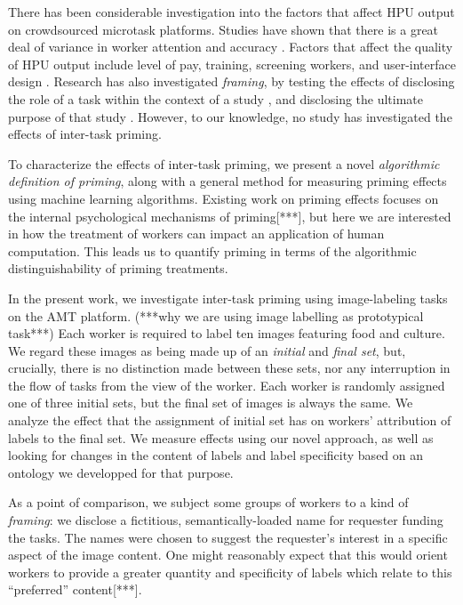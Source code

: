 \documentclass[a4paper]{report}
\begin{document}
There has been considerable investigation into the factors that affect HPU 
output on crowdsourced microtask platforms.  Studies have shown that 
there is a great deal of variance in worker attention and 
accuracy \cite{kazai2013analysis}.  Factors that affect the quality of HPU 
output include level of pay\cite{kazai2013analysis}, 
training\cite{le2010ensuring}, screening workers\cite{paolacci2010running}, 
and user-interface design
\cite{Finnerty2013}.  Research has also investigated \textit{framing}, 
by testing the effects of disclosing the role of a task within the 
context of a study \cite{Kinnaird2012281}, and disclosing the ultimate 
purpose of that study \cite{chandler2013breaking}.  However, to our knowledge, 
no study has investigated the effects of inter-task priming.

To characterize the effects of inter-task priming, we present a novel  
\textit{algorithmic definition of priming}, along with a general method 
for measuring priming effects using machine learning algorithms.  
Existing work on priming effects focuses on the internal psychological 
mechanisms of priming[***], but here we are interested in how the treatment of 
workers can impact an application of human computation. This leads us to 
quantify priming in terms of the algorithmic distinguishability of priming
treatments.

In the present work, we investigate inter-task priming using image-labeling 
tasks on the AMT platform.  
(***why we are using image labelling as prototypical task***) 
Each worker is required to label ten images 
featuring 
food and culture.  We regard these images as being made up of an 
\textit{initial} and \textit{final set}, but, crucially, there is no
distinction made between these sets, nor any interruption in the flow of tasks 
from the view of the worker.
Each worker is randomly assigned one of three initial sets, but the final set
of images is always the same.  We analyze the effect that the assignment of 
initial set has on workers' attribution of labels to the final set.  We 
measure effects using our novel approach, as well as looking for changes in 
the content of labels and label specificity based on an ontology we 
developped for that purpose.

As a point of comparison, we subject some groups of workers to a kind of
\textit{framing}: we disclose a fictitious, semantically-loaded name for 
requester funding the tasks.
The names were chosen to suggest the requester's interest in 
a specific aspect of the image content.  One might reasonably expect that this 
would orient workers to provide a greater quantity and specificity of labels 
which relate to this ``preferred'' content[***].
\end{document}
